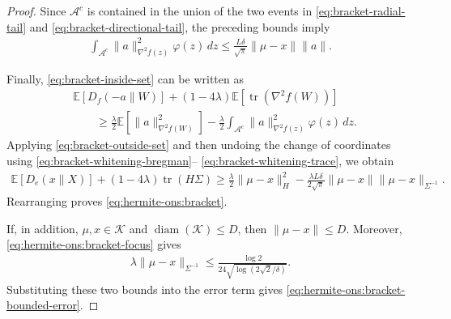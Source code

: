 \documentclass{article}
\theoremstyle{plain}
\theoremstyle{definition}
\theoremstyle{plain}
\newcommand{\tr}{\operatorname{tr}}
\newcommand{\E}{\mathbb E}
\newcommand{\cN}{\mathcal N}
\begin{document}
\begin{proof}
    Since $\mathcal A^c$ is contained in the union of the two events
    in \eqref{eq:bracket-radial-tail} and
    \eqref{eq:bracket-directional-tail}, the preceding bounds imply
    \begin{align}
        \int_{\mathcal A^c}
        \|a\|_{\nabla^2f(z)}^2
        \varphi(z)\,dz
        \leq
        \frac{L\delta}{\sqrt\pi}
        \|\mu-x\|\|a\|.
        \label{eq:bracket-outside-set}
    \end{align}

    Finally, \eqref{eq:bracket-inside-set} can be written as
    \begin{align}
         & \E[D_f(-a\|W)]
        +(1-4\lambda)\E[\tr(\nabla^2f(W))]
        \nonumber         \\
         & \qquad\geq
        \frac{\lambda}{2}
        \E\!\left[\|a\|_{\nabla^2f(W)}^2\right]
        -
        \frac{\lambda}{2}
        \int_{\mathcal A^c}
        \|a\|_{\nabla^2f(z)}^2
        \varphi(z)\,dz.
    \end{align}
    Applying \eqref{eq:bracket-outside-set} and then undoing the
    change of coordinates using
    \eqref{eq:bracket-whitening-bregman}--%
    \eqref{eq:bracket-whitening-trace}, we obtain
    \begin{align}
        \E[D_e(x\|X)]
        +(1-4\lambda)\tr(H\Sigma)
        \geq
        \frac{\lambda}{2}\|\mu-x\|_H^2
        -
        \frac{\lambda L\delta}{2\sqrt\pi}
        \|\mu-x\|
        \|\mu-x\|_{\Sigma^{-1}}.
    \end{align}
    Rearranging proves \eqref{eq:hermite-ons:bracket}.

    If, in addition, $\mu,x\in\mathcal K$ and
    $\operatorname{diam}(\mathcal K)\leq D$, then
    $\|\mu-x\|\leq D$. Moreover,
    \eqref{eq:hermite-ons:bracket-focus} gives
    \begin{align}
        \lambda\|\mu-x\|_{\Sigma^{-1}}
        \leq
        \frac{\log2}
        {24\sqrt{\log(2\sqrt2/\delta)}}.
    \end{align}
    Substituting these two bounds into the error term gives
    \eqref{eq:hermite-ons:bracket-bounded-error}.
\end{proof}

\end{document}
